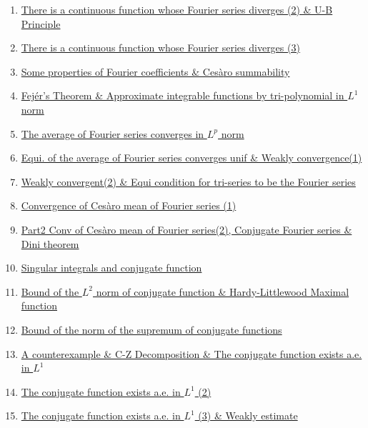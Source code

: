 \documentclass[11pt]{article}
\begin{document}
\begin{enumerate}
	\item 	\href{https://mp.weixin.qq.com/s/oKttb__jq2pKibQdCnYIaQ}{There is a continuous function whose Fourier series diverges (2) \& U-B Principle}	%
	\item 	\href{https://mp.weixin.qq.com/s/rU_2kcw87mMTQuXjp9fUsg}{There is a continuous function whose Fourier series diverges (3)}	%
	\item 	\href{https://mp.weixin.qq.com/s/87XlLeL26f3vOXPBRmddpw}{Some properties of Fourier coefficients \& Ces{\`a}ro summability}	%
	\item	\href{https://mp.weixin.qq.com/s/kgk7MZTcNpfu08XCIQ6t-g}{Fej{\'e}r's Theorem \& Approximate integrable functions by tri-polynomial in $L^1$ norm}	%
	\item	\href{https://mp.weixin.qq.com/s/WM8zcUumRN9p9GYxwXrwcA}{The average of Fourier series converges in $L^p$ norm}	%
	\item	\href{https://mp.weixin.qq.com/s/7SOCAwFJl6shN7zZYzxawA}{Equi. of the average of Fourier series converges unif \& Weakly convergence(1)} 	%
	\item 	\href{https://mp.weixin.qq.com/s/l9FCzc3oqCubRO9Lahw-1A}{Weakly convergent(2) \& Equi condition for tri-series to be the Fourier series}	%
	\item 	\href{https://mp.weixin.qq.com/s/AwlsQ6712yUi8sZOBSKsoQ}{Convergence of Ces{\`a}ro mean of Fourier series (1)}	%
	\item 	\href{https://mp.weixin.qq.com/s/UAJ-SlyftrjAhJLYvweyLA}{Part2 Conv of Ces{\`a}ro mean of Fourier series(2), Conjugate Fourier series \& Dini theorem}	%
	\item 	\href{https://mp.weixin.qq.com/s/mA4UFcgAXrz3RDs4U-ObXg}{Singular integrals and conjugate function}	%
	\item 	\href{https://mp.weixin.qq.com/s/oWeNCTB67MkHA9K_RBhAnQ}{Bound of the $L^2$ norm of conjugate function \& Hardy-Littlewood Maximal function}	%
	\item 	\href{https://mp.weixin.qq.com/s/A6kNkEUNTW_L4yA_VXEzOg}{Bound of the norm of the supremum of conjugate functions}	%
	\item 	\href{https://mp.weixin.qq.com/s/Zx1xLGXJ1we4dVDY_Zt0tg}{A counterexample \& C-Z Decomposition \& The conjugate function exists a.e. in $L^1$}	%
	\item	\href{https://mp.weixin.qq.com/s/Yo5DnLRpAZ0Yz2J-riK8Nw}{The conjugate function exists a.e. in $L^1$ (2)}	%
	\item	\href{https://mp.weixin.qq.com/s/8zYuUi7SjpPN64m08FL9PA}{The conjugate function exists a.e. in $L^1$ (3) \& Weakly estimate}	%

\end{enumerate}
\end{document}
